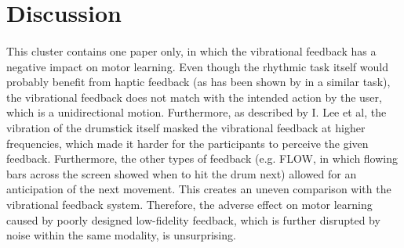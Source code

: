\pagebreak

\section{Discussion}

\paragraph{}
This cluster contains one paper only, in which the vibrational feedback has a negative impact on motor learning. Even though the rhythmic task itself would probably benefit from haptic feedback (as has been shown by \cite{Graham2008} in a similar task), the vibrational feedback does not match with the intended action by the user, which is a unidirectional motion. Furthermore, as described by I. Lee et al, the vibration of the drumstick itself masked the vibrational feedback at higher frequencies, which made it harder for the participants to perceive the given feedback. Furthermore, the other types of feedback (e.g. FLOW, in which flowing bars across the screen showed when to hit the drum next) allowed for an anticipation of the next movement. This creates an uneven comparison with the vibrational feedback system. Therefore, the adverse effect on motor learning caused by poorly designed low-fidelity feedback, which is further disrupted by noise within the same modality, is unsurprising.

